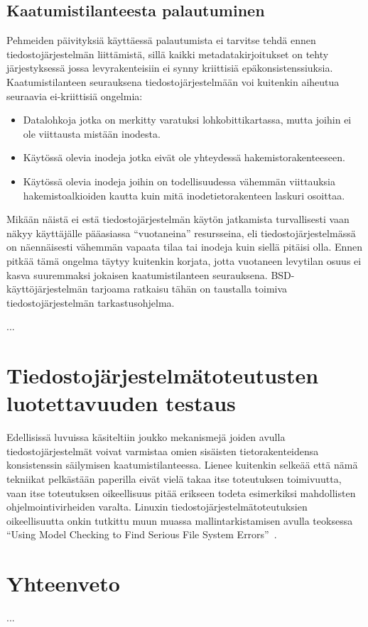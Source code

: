 \subsection{Kaatumistilanteesta palautuminen}
Pehmeiden päivityksiä käyttäessä palautumista ei tarvitse tehdä ennen tiedostojärjestelmän liittämistä,
sillä kaikki metadatakirjoitukset on tehty järjestyksessä jossa levyrakenteisiin ei synny kriittisiä epäkonsistenssiuksia.
Kaatumistilanteen seurauksena tiedostojärjestelmään voi kuitenkin aiheutua seuraavia ei-kriittisiä ongelmia:
\begin{itemize}
    \item{Datalohkoja jotka on merkitty varatuksi lohkobittikartassa, mutta joihin ei ole viittausta mistään inodesta.}
    \item{Käytössä olevia inodeja jotka eivät ole yhteydessä hakemistorakenteeseen.}
    \item{Käytössä olevia inodeja joihin on todellisuudessa vähemmän viittauksia hakemistoalkioiden kautta kuin mitä inodetietorakenteen laskuri osoittaa.}
\end{itemize}
Mikään näistä ei estä tiedostojärjestelmän käytön jatkamista turvallisesti vaan näkyy käyttäjälle pääasiassa ``vuotaneina'' resursseina,
eli tiedostojärjestelmässä on näennäisesti vähemmän vapaata tilaa tai inodeja kuin siellä pitäisi olla.
Ennen pitkää tämä ongelma täytyy kuitenkin korjata,
jotta vuotaneen levytilan osuus ei kasva suuremmaksi jokaisen kaatumistilanteen seurauksena.
BSD-käyttöjärjestelmän tarjoama ratkaisu tähän on taustalla toimiva tiedostojärjestelmän tarkastusohjelma.

...

\section{Tiedostojärjestelmätoteutusten luotettavuuden testaus}

Edellisissä luvuissa käsiteltiin joukko mekanismejä joiden avulla tiedostojärjestelmät voivat varmistaa omien sisäisten tietorakenteidensa konsistenssin säilymisen kaatumistilanteessa.
Lienee kuitenkin selkeää että nämä tekniikat pelkästään paperilla eivät vielä takaa itse toteutuksen toimivuutta,
vaan itse toteutuksen oikeellisuus pitää erikseen todeta esimerkiksi mahdollisten ohjelmointivirheiden varalta.
Linuxin tiedostojärjestelmätoteutuksien oikeellisuutta onkin tutkittu muun muassa mallintarkistamisen avulla teoksessa ``Using Model Checking to Find Serious File System Errors''~\cite{ModelChecking}.

\section{Yhteenveto}

...
